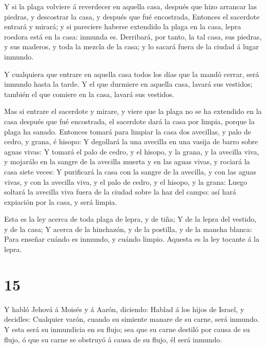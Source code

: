  Y si la plaga volviere á reverdecer en aquella casa,
después que hizo arrancar las piedras, y descostrar la casa, y después
que fué encostrada,  Entonces el sacerdote entrará y
mirará; y si pareciere haberse extendido la plaga en la casa, lepra
roedora está en la casa: inmunda es.  Derribará, por tanto,
la tal casa, sus piedras, y sus maderos, y toda la mezcla de la casa; y
lo sacará fuera de la ciudad á lugar inmundo.

 Y cualquiera que entrare en aquella casa todos los días
que la mandó cerrar, será inmundo hasta la tarde.  Y el que
durmiere en aquella casa, lavará sus vestidos; también el que comiere en
la casa, lavará sus vestidos.

 Mas si entrare el sacerdote y mirare, y viere que la plaga
no se ha extendido en la casa después que fué encostrada, el sacerdote
dará la casa por limpia, porque la plaga ha sanado. 
Entonces tomará para limpiar la casa dos avecillas, y palo de cedro, y
grana, é hisopo:  Y degollará la una avecilla en una vasija
de barro sobre aguas vivas:  Y tomará el palo de cedro, y
el hisopo, y la grana, y la avecilla viva, y mojarálo en la sangre de la
avecilla muerta y en las aguas vivas, y rociará la casa siete veces:
 Y purificará la casa con la sangre de la avecilla, y con
las aguas vivas, y con la avecilla viva, y el palo de cedro, y el
hisopo, y la grana:  Luego soltará la avecilla viva fuera
de la ciudad sobre la haz del campo: así hará expiación por la casa, y
será limpia.

 Esta es la ley acerca de toda plaga de lepra, y de tiña;
 Y de la lepra del vestido, y de la casa;  Y
acerca de la hinchazón, y de la postilla, y de la mancha blanca:
 Para enseñar cuándo es inmundo, y cuándo limpio. Aquesta
es la ley tocante á la lepra.

\hypertarget{section-14}{%
\section{15}\label{section-14}}

 Y habló Jehová á Moisés y á Aarón, diciendo: 
Hablad á los hijos de Israel, y decidles: Cualquier varón, cuando su
simiente manare de su carne, será inmundo.  Y esta será su
inmundicia en su flujo; sea que su carne destiló por causa de su flujo,
ó que su carne se obstruyó á causa de su flujo, él será inmundo.

